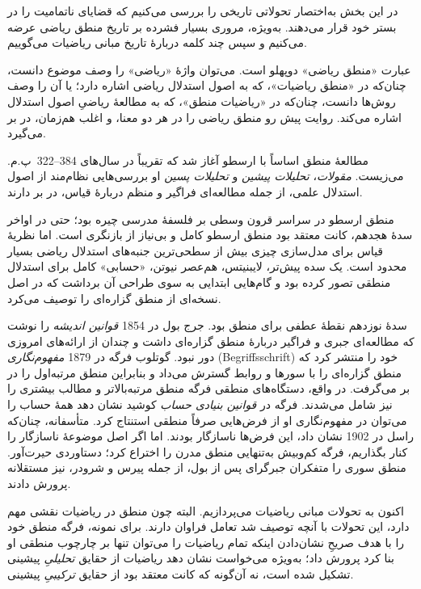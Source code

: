\documentclass[../../../include/open-logic-section]{subfiles}
\begin{document}


در این بخش به‌اختصار تحولاتی تاریخی را بررسی می‌کنیم که قضایای
ناتمامیت را در بستر خود قرار می‌دهند. به‌ویژه، مروری بسیار فشرده بر
تاریخ منطق ریاضی عرضه می‌کنیم و سپس چند کلمه دربارهٔ تاریخ مبانی
ریاضیات می‌گوییم.

\begin{digress}
  عبارت «منطق ریاضی» دوپهلو است. می‌توان واژهٔ «ریاضی» را وصف موضوع
  دانست، چنان‌که در «منطق ریاضیات»، که به اصول استدلال ریاضی اشاره
  دارد؛ یا آن را وصف روش‌ها دانست، چنان‌که در «ریاضیات منطق»، که به
  مطالعهٔ ریاضیِ اصول استدلال اشاره می‌کند. روایت پیش رو منطق ریاضی
  را در هر دو معنا، و اغلب هم‌زمان، در بر می‌گیرد.
\end{digress}

مطالعهٔ منطق اساساً با ارسطو آغاز شد که تقریباً در سال‌های
384--322~\textsc{پ.م.} می‌زیست. \emph{مقولات}، \emph{تحلیلات پیشین}
و \emph{تحلیلات پسین} او بررسی‌هایی نظام‌مند از اصول استدلال علمی،
از جمله مطالعه‌ای فراگیر و منظم دربارهٔ قیاس، در بر دارند.

منطق ارسطو در سراسر قرون وسطی بر فلسفهٔ مدرسی چیره بود؛ حتی در اواخر
سدهٔ هجدهم، کانت معتقد بود منطق ارسطو کامل و بی‌نیاز از بازنگری است.
اما نظریهٔ قیاس برای مدل‌سازی چیزی بیش از سطحی‌ترین جنبه‌های استدلال
ریاضی بسیار محدود است. یک سده پیش‌تر، لایبنیتس، هم‌عصر نیوتن،
«حسابی» کامل برای استدلال منطقی تصور کرده بود و گام‌هایی ابتدایی به
سوی طراحی آن برداشت که در اصل نسخه‌ای از منطق گزاره‌ای را توصیف
می‌کرد.

سدهٔ نوزدهم نقطهٔ عطفی برای منطق بود. جرج بول در 1854 \emph{قوانین
اندیشه} را نوشت که مطالعه‌ای جبری و فراگیر دربارهٔ منطق گزاره‌ای
داشت و چندان از ارائه‌های امروزی دور نبود. گوتلوب فرگه در 1879
\emph{مفهوم‌نگاری} (Begriffsschrift) خود را منتشر کرد که منطق
گزاره‌ای را با سورها و روابط گسترش می‌داد و بنابراین منطق مرتبه‌اول
را در بر می‌گرفت. در واقع، دستگاه‌های منطقی فرگه منطق مرتبه‌بالاتر و
مطالب بیشتری را نیز شامل می‌شدند. فرگه در \emph{قوانین بنیادی حساب}
کوشید نشان دهد همهٔ حساب را می‌توان در مفهوم‌نگاری او از فرض‌هایی
صرفاً منطقی استنتاج کرد. متأسفانه، چنان‌که راسل در 1902 نشان داد، این
فرض‌ها ناسازگار بودند. اما اگر اصل موضوعهٔ ناسازگار را کنار بگذاریم،
فرگه کم‌وبیش به‌تنهایی منطق مدرن را اختراع کرد؛ دستاوردی حیرت‌آور.
منطق سوری را متفکران جبرگرای پس از بول، از جمله پیرس و شرودر، نیز
مستقلانه پرورش دادند.

اکنون به تحولات مبانی ریاضیات می‌پردازیم. البته چون منطق در ریاضیات
نقشی مهم دارد، این تحولات با آنچه توصیف شد تعامل فراوان دارند. برای
نمونه، فرگه منطق خود را با هدف صریحِ نشان‌دادن اینکه تمام ریاضیات را
می‌توان تنها بر چارچوب منطقی او بنا کرد پرورش داد؛ به‌ویژه می‌خواست
نشان دهد ریاضیات از حقایق \emph{تحلیلیِ} پیشینی تشکیل شده است، نه
آن‌گونه که کانت معتقد بود از حقایق \emph{ترکیبیِ} پیشینی.
\end{document}

